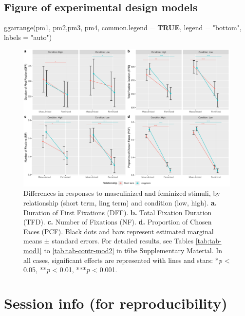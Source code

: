 \documentclass[
  bookmarksnumbered]{article}
\newenvironment{Shaded}{\begin{snugshade}}{\end{snugshade}}
\newcommand{\AttributeTok}[1]{\textcolor[rgb]{0.80,0.80,0.80}{#1}}
\newcommand{\ConstantTok}[1]{\textcolor[rgb]{0.86,0.64,0.64}{\textbf{#1}}}
\newcommand{\FunctionTok}[1]{\textcolor[rgb]{0.94,0.94,0.56}{#1}}
\newcommand{\NormalTok}[1]{\textcolor[rgb]{0.80,0.80,0.80}{#1}}
\newcommand{\StringTok}[1]{\textcolor[rgb]{0.80,0.58,0.58}{#1}}
\begin{document}
\subsection{Figure of experimental design models}\label{figure-of-experimental-design-models}

\begin{Shaded}
\begin{Highlighting}[]
\FunctionTok{ggarrange}\NormalTok{(pm1, pm2,pm3, pm4,}
          \AttributeTok{common.legend =} \ConstantTok{TRUE}\NormalTok{,}
          \AttributeTok{legend =} \StringTok{"bottom"}\NormalTok{,}
          \AttributeTok{labels =} \StringTok{"auto"}\NormalTok{)}
\end{Highlighting}
\end{Shaded}

\begin{figure}
\centering
\includegraphics{Supplementary_material_files/figure-latex/unnamed-chunk-47-1.pdf}
\caption{\label{fig:unnamed-chunk-47}Differences in responses to masculinized and feminized stimuli, by relationship (short term, ling term) and condition (low, high). \textbf{a.} Duration of First Fixations (DFF). \textbf{b.} Total Fixation Duration (TFD). \textbf{c.} Number of Fixations (NF). \textbf{d.} Proportion of Chosen Faces (PCF). Black dots and bars represent estimated marginal means ± standard errors. For detailed results, see Tables \ref{tab:tab-mod1} to \ref{tab:tab-contr-mod2} in t6he Supplementary Material. In all cases, significant effects are represented with lines and stars: *\emph{p} \textless{} 0.05, **\emph{p} \textless{} 0.01, ***\emph{p} \textless{} 0.001.}
\end{figure}

\section{Session info (for reproducibility)}\label{session}
\end{document}
